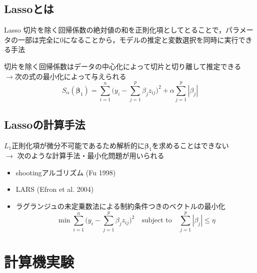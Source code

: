 \documentclass[dvipdfmx, 10pt]{beamer}
\begin{document}
\subsection{Lassoとは}
\begin{frame}{\insertsubsection}
    \begin{block}{Lasso}
        切片を除く回帰係数の絶対値の和を正則化項としてとることで，パラメータの一部は完全に0になることから，モデルの推定と変数選択を同時に実行できる手法
    \end{block}
    \vspace{10pt}
    切片を除く回帰係数はデータの中心化によって切片と切り離して推定できる\\
    $\rightarrow$次の式の最小化によって与えられる
    \begin{equation}
        S_{\alpha}(\bm\beta_1) = \sum_{i=1}^{n} \bigl(
        	y_i - \sum_{j=1}^{p} \beta_j z_{ij}
        \bigr)^2 + \alpha \sum_{j=1}^{p}|\beta_j|
    \end{equation}
\end{frame}
\subsection{Lassoの計算手法}
\begin{frame}{\insertsubsection}
    $L_1$正則化項が微分不可能であるため解析的に$\bm{\beta}_1$を求めることはできない\\
    $\rightarrow$ 次のような計算手法・最小化問題が用いられる
    \begin{itemize}
	\item shootingアルゴリズム (Fu 1998)
	\item LARS (Efron et al. 2004)
	\item ラグランジュの未定乗数法による制約条件つきのベクトルの最小化
	\begin{equation}
        	\min \sum_{i=1}^{n}\bigl(
        		 y_i - \sum_{j=1}^{p} \beta_j z_{ij}
        	\bigr)^2 \quad
        	\text{subject to} \quad \sum_{j=1}^{p} |\beta_j| \leq \eta
        \end{equation}
    \end{itemize}
\end{frame}

\section{計算機実験}
\end{document}
